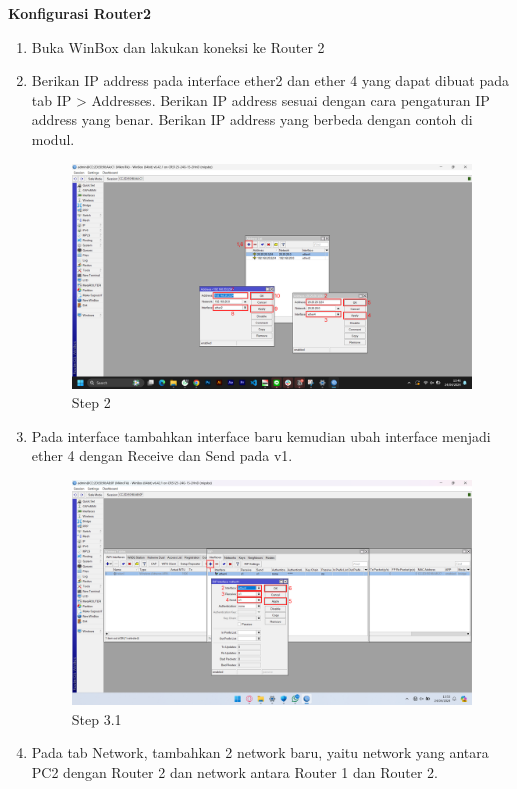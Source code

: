 \begin{center}
	\textbf{Konfigurasi Router2}
	\begin{enumerate}
		\item Buka WinBox dan lakukan koneksi ke Router 2
		\item Berikan IP address pada interface ether2 dan ether 4 yang dapat dibuat pada tab IP > Addresses. Berikan IP address sesuai dengan cara pengaturan IP address yang benar. Berikan IP address yang berbeda dengan contoh di modul.
		\begin{figure}[H]
			\centering
			\includegraphics[width=0.9\linewidth]{P2/img/per1/pc2/Step 2.png}
			\caption{Step 2}
			\label{fig:Step 2(Per.2 PC2)}
		\end{figure}
		\item Pada interface tambahkan interface baru kemudian ubah interface menjadi ether 4 dengan Receive dan Send pada v1.
		\begin{figure}[H]
			\centering
			\includegraphics[width=0.9\linewidth]{P2/img/per2/pc1/Step 3.2.png}
			\caption{Step 3.1}
			\label{fig:Step 3.1(Per.2 PC2)}
		\end{figure}
		\item Pada tab Network, tambahkan 2 network baru, yaitu network yang antara PC2 dengan Router 2 dan network antara Router 1 dan Router 2.

\end{enumerate}
\end{center}
